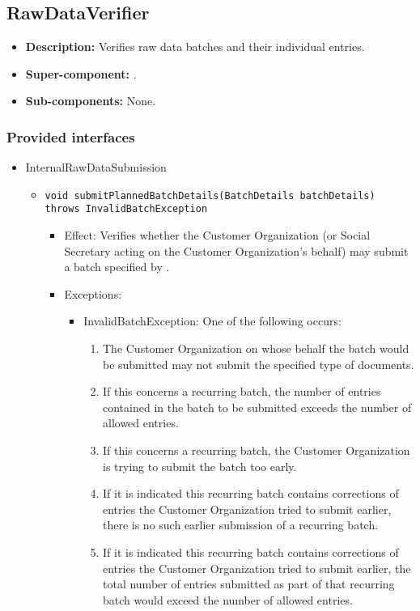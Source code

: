 \subsection{RawDataVerifier}
\begin{itemize}
	\item \textbf{Description:} Verifies raw data batches and their individual entries.
	\item \textbf{Super-component:} .
	\item \textbf{Sub-components:} None.
\end{itemize}

\subsubsection*{Provided interfaces}
\begin{itemize}
	\item InternalRawDataSubmission
	\begin{itemize}
		\item \texttt{void submitPlannedBatchDetails(BatchDetails batchDetails) throws InvalidBatchException}
		\begin{itemize}
			\item Effect: Verifies whether the Customer Organization (or Social Secretary acting on the Customer Organization's behalf) may submit a batch specified by .
			\item Exceptions:
			\begin{itemize}
				\item InvalidBatchException: One of the following occurs:
				\begin{enumerate}
					\item The Customer Organization on whose behalf the batch would be submitted may not submit the specified type of documents.
					\item If this concerns a recurring batch, the number of entries contained in the batch to be submitted exceeds the number of allowed entries.
					\item If this concerns a recurring batch, the Customer Organization is trying to submit the batch too early.
					\item If it is indicated this recurring batch contains corrections of entries the Customer Organization tried to submit earlier, there is no such earlier submission of a recurring batch.
					\item If it is indicated this recurring batch contains corrections of entries the Customer Organization tried to submit earlier, the total number of entries submitted as part of that recurring batch would exceed the number of allowed entries.
				\end{enumerate}
			\end{itemize}
		\end{itemize}
		

\end{itemize}
\end{itemize}
